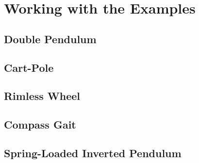 \section{Working with the Examples}
\subsection{Double Pendulum}
\subsection{Cart-Pole}
\subsection{Rimless Wheel}
\subsection{Compass Gait}
\subsection{Spring-Loaded Inverted Pendulum}

